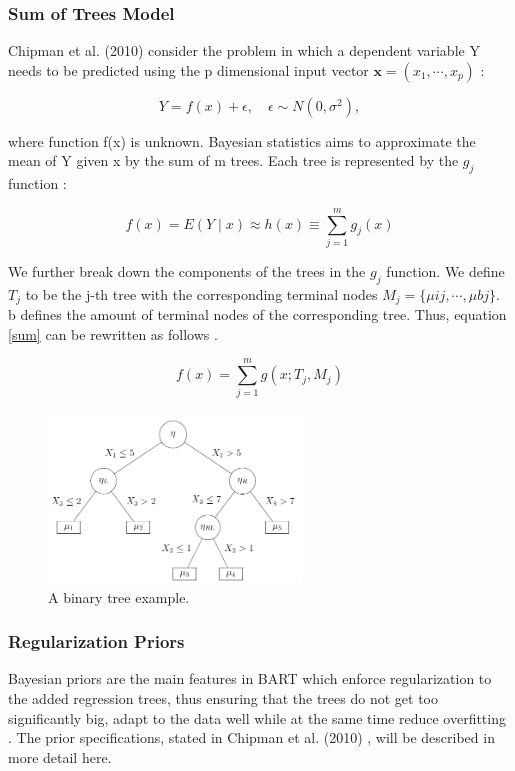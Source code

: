 \documentclass{usiinftr}
\begin{document}
\subsubsection{Sum of Trees Model}
Chipman et al. (2010) consider the problem in which a dependent variable Y needs to be predicted using the p dimensional input vector $\textbf{x} = (x_1,\cdots, x_p)$ \cite{7}:

\begin{equation}
Y=f(x)+\epsilon, \quad \epsilon \sim N\left(0, \sigma^{2}\right),
\end{equation}

where function f(x) is unknown. Bayesian statistics aims to approximate the mean of Y given x by the sum of m trees. Each tree is represented by the $g_j$ function \cite{7}:

\begin{equation} \label{sum}
f(x)=E(Y \mid x) \approx h(x) \equiv \sum_{j=1}^{m} g_{j}(x)
\end{equation}

We further break down the components of the trees in the $g_j$ function. We define $T_j$ to be the j-th tree with the corresponding terminal nodes $M_j = \{ \mu{ij}, \cdots, \mu{bj} \}$. b defines the amount of terminal nodes of the corresponding tree. Thus, equation \ref{sum} can be rewritten as follows \cite{7}.

\begin{equation} \label{sum1}
f(x)= \sum_{j=1}^{m} g(x;T_j,M_j)
\end{equation}

\begin{figure}[h!] 
\centering
\includegraphics[width=0.6\textwidth]{images/image113.png}
\caption{A binary tree example.}
\label{bintree}
\end{figure}

\subsubsection{Regularization Priors}\label{prior}
Bayesian priors are the main features in BART which enforce regularization to the added regression trees, thus ensuring that the trees do not get too significantly big, adapt to the data well while at the same time reduce overfitting \cite{7}. The prior specifications, stated in Chipman et al. (2010) \cite{7}, will be described in more detail here.
\end{document}

